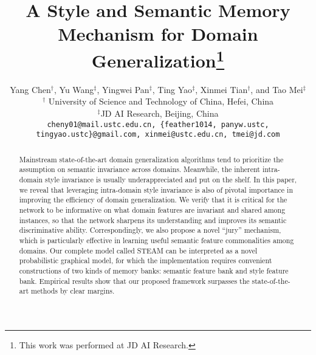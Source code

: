 \documentclass[10pt,twocolumn,letterpaper]{article}
\newcommand{\0}{{\bf 0}}
\begin{document}
\title{A Style and Semantic Memory Mechanism for Domain Generalization\thanks{{\small This work was performed at JD AI Research.}}}
\author{Yang Chen$^\dagger$, Yu Wang$^\ddagger$, Yingwei Pan$^\ddagger$, Ting Yao$^\ddagger$, Xinmei Tian$^\dagger$, and Tao Mei$^\ddagger$\\
\small $^\dagger$ University of Science and Technology of China, Hefei, China\\
\small $^\ddagger$JD AI Research, Beijing, China
\\
{\tt\scriptsize cheny01@mail.ustc.edu.cn, \{feather1014, panyw.ustc, tingyao.ustc\}@gmail.com, xinmei@ustc.edu.cn, tmei@jd.com}
}

\maketitle
\ificcvfinal\thispagestyle{empty}\fi

\begin{abstract}
Mainstream state-of-the-art domain generalization algorithms tend to prioritize the assumption on semantic invariance across domains. Meanwhile, the inherent intra-domain style invariance is usually underappreciated and put on the shelf. In this paper, we reveal that leveraging intra-domain style invariance is also of pivotal importance in improving the efficiency of domain generalization. We verify that it is critical for the network to be informative on what domain features are invariant and shared among instances, so that the network sharpens its understanding and improves its semantic discriminative ability. Correspondingly, we also propose a novel ``jury'' mechanism, which is particularly effective in learning useful semantic feature commonalities among domains. Our complete model called STEAM can be interpreted as a novel probabilistic graphical model, for which the implementation requires convenient constructions of two kinds of memory banks: semantic feature bank and style feature bank. Empirical results show that our proposed framework surpasses the state-of-the-art methods by clear margins.
\end{abstract}
\end{document}
